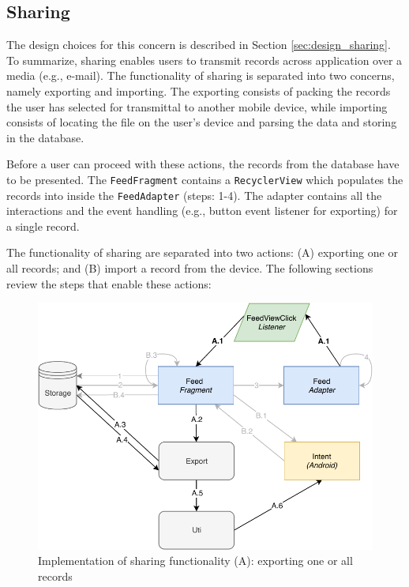 \subsection{Sharing}

The design choices for this concern is described in Section \ref{sec:design_sharing}. To summarize, sharing enables users to transmit records across application over a media (e.g., e-mail). The functionality of sharing is separated into two concerns, namely exporting and importing. The exporting consists of packing the records the user has selected for transmittal to another mobile device, while importing consists of locating the file on the user's device and parsing the data and storing in the database.

Before a user can proceed with these actions, the records from the database have to be presented. The \verb|FeedFragment| contains a \verb|RecyclerView| which populates the records into inside the \verb|FeedAdapter| (steps: 1-4). The adapter contains all the interactions and the event handling (e.g., button event listener for exporting) for a single record. 

The functionality of sharing are separated into two actions: (A) exporting one or all records; and (B) import a record from the device. The following sections review the steps that enable these actions:


\begin{figure}
    \centering
    \includegraphics[scale=0.7]{images/Sharing_ImpA.pdf}
    \caption{Implementation of sharing functionality (A): exporting one or all records}
    \label{fig:impl_sharingA}
\end{figure}

